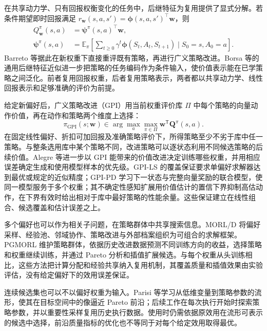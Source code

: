 在共享动力学、只有回报权衡变化的任务中，后继特征为复用提供了显式分解。若条件期望即时回报满足 $r_{\mathbf w}(s,a,s')=\boldsymbol\phi(s,a,s')^\top\mathbf w$，则
\begin{equation}
\begin{aligned}
Q_{\mathbf w}^{\pi}(s,a)
&=\boldsymbol\psi^\pi(s,a)^\top\mathbf w,\\
\boldsymbol\psi^\pi(s,a)
&=\mathbb E_\pi\!\left[\sum_{t\geq0}\gamma^t\boldsymbol\phi(S_t,A_t,S_{t+1})\mid S_0=s,A_0=a\right].
\end{aligned}
\end{equation}
Barreto 等据此在新权重下直接重评既有策略，再进行广义策略改进\cite{barreto2017sf}。Borsa 等的通用后继特征近似进一步把策略的任务编码作为条件输入，使价值表示能在已学策略之间泛化\cite{borsa2019usfa}。前者复用回报权重，后者复用策略表示，两者都以共享动力学、线性回报表示和足够准确的评价为前提。

给定新偏好后，广义策略改进（GPI）用当前权重评价库 $\Pi$ 中每个策略的向量动作价值，再在动作和策略两个维度上选择：
\begin{equation}
\pi_{\mathrm{GPI}}(s;\mathbf w)
\in\arg\max_a\max_{\pi\in\Pi}
\mathbf w^{\mathsf T}\mathbf Q^\pi(s,a).
\end{equation}
在固定线性偏好、折扣可加回报及准确策略评价下，所得策略至少不劣于库中任一策略\cite{alegre2026}。与整条选用库中某个策略不同，改进策略可以逐状态利用不同候选策略的后续价值。Alegre 等进一步以 GPI 能带来的价值改进决定训练哪些权重，并用相应误差确定生成和使用模型样本的优先级。GPI-LS 的覆盖保证要求单偏好求解器达到最优或规定的近似精度；GPI-PD 学习下一状态与完整向量奖励的联合模型，使同一模型服务于多个权重；其不确定性感知扩展用价值估计的置信下界抑制高估动作，在下界有效时给出相对于库中最好策略的性能余量。这些保证建立在线性组合、候选覆盖和估计误差之上。

多个偏好也可以作为相关子问题，在策略群体中共享搜索信息。MORL/D 将偏好采样、经验池、邻域协作、策略改进与外部档案组织为可组合的求解框架\cite{felten2024decomposition}。PGMORL 维护策略群体，依据历史改进数据预测不同训练方向的收益，选择策略和权重继续训练，并通过 Pareto 分析和插值扩展候选\cite{xu2020pgmorl}。与每个权重从头训练相比，这些方法把计算分配和经验共享纳入复用机制，其覆盖质量和插值效果由实验评估，没有给定偏好下的效用误差保证。

连续候选集也可以不以偏好权重为输入。Parisi 等学习从低维变量到策略参数的流形，使其在目标空间中的像逼近 Pareto 前沿\cite{parisi2016manifold}；后续工作在每次执行开始时探索策略参数，并以重要性采样复用历史执行数据\cite{parisi2017reuse}。使用时仍需依据原效用在流形可表示的候选中选择，前沿质量指标的优化也不等同于对每个给定效用取得最优。

